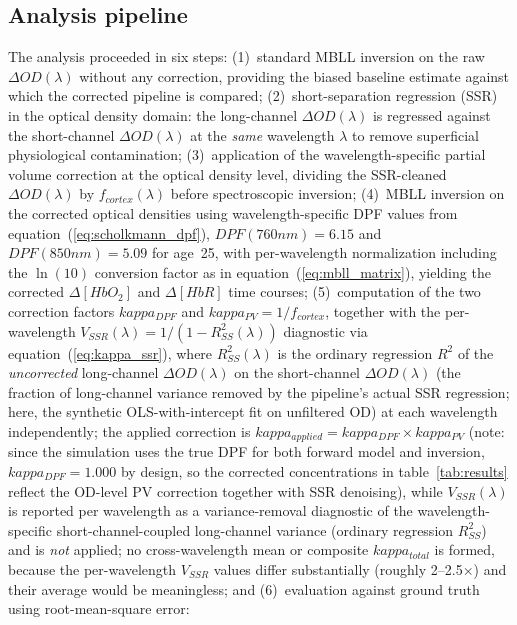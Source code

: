 \documentclass[11pt]{article}
\def\kappa{kappa}%
\def\mathrm#1{#1}%
\def\,{ }%
\begin{document}
\subsection{Analysis pipeline}
\label{sec:pipeline}

The analysis proceeded in six steps: (1)~standard MBLL inversion on the raw $\Delta\mathrm{OD}(\lambda)$ without any correction, providing the biased baseline estimate against which the corrected pipeline is compared; (2)~short-separation regression (SSR) in the optical density domain: the long-channel $\Delta\mathrm{OD}(\lambda)$ is regressed against the short-channel $\Delta\mathrm{OD}(\lambda)$ at the \emph{same} wavelength $\lambda$ to remove superficial physiological contamination\cite{r15,r18,r19}; (3)~application of the wavelength-specific partial volume correction at the optical density level, dividing the SSR-cleaned $\Delta\mathrm{OD}(\lambda)$ by $f_{\mathrm{cortex}}(\lambda)$ before spectroscopic inversion; (4)~MBLL inversion on the corrected optical densities using wavelength-specific DPF values from equation~(\ref{eq:scholkmann_dpf}), $\mathrm{DPF}(760\,\mathrm{nm}) = 6.15$ and $\mathrm{DPF}(850\,\mathrm{nm}) = 5.09$ for age~25\cite{r14}, with per-wavelength normalization including the $\ln(10)$ conversion factor as in equation~(\ref{eq:mbll_matrix}), yielding the corrected $\Delta[\mathrm{HbO}_2]$ and $\Delta[\mathrm{HbR}]$ time courses; (5)~computation of the two correction factors $\kappa_{\mathrm{DPF}}$ and $\kappa_{\mathrm{PV}} = 1/f_{\mathrm{cortex}}$, together with the per-wavelength $V_{\mathrm{SSR}}(\lambda) = 1/(1-R^2_{\mathrm{SS}}(\lambda))$ diagnostic via equation~(\ref{eq:kappa_ssr}), where $R^2_{\mathrm{SS}}(\lambda)$ is the ordinary regression $R^2$ of the \emph{uncorrected} long-channel $\Delta\mathrm{OD}(\lambda)$ on the short-channel $\Delta\mathrm{OD}(\lambda)$ (the fraction of long-channel variance removed by the pipeline's actual SSR regression; here, the synthetic OLS-with-intercept fit on unfiltered OD) at each wavelength independently; the applied correction is $\kappa_{\mathrm{applied}} = \kappa_{\mathrm{DPF}} \times \kappa_{\mathrm{PV}}$ (note: since the simulation uses the true DPF for both forward model and inversion, $\kappa_{\mathrm{DPF}} = 1.000$ by design, so the corrected concentrations in table~\ref{tab:results} reflect the OD-level PV correction together with SSR denoising), while $V_{\mathrm{SSR}}(\lambda)$ is reported per wavelength as a variance-removal diagnostic of the wavelength-specific short-channel-coupled long-channel variance (ordinary regression $R^2_{\mathrm{SS}}$) and is \emph{not} applied; no cross-wavelength mean or composite $\kappa_{\mathrm{total}}$ is formed, because the per-wavelength $V_{\mathrm{SSR}}$ values differ substantially (roughly 2--2.5$\times$) and their average would be meaningless; and (6)~evaluation against ground truth using root-mean-square error:
\end{document}
